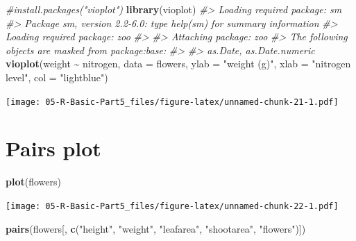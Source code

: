 \documentclass[
]{book}
\newenvironment{Shaded}{\begin{snugshade}}{\end{snugshade}}
\newcommand{\AttributeTok}[1]{\textcolor[rgb]{0.13,0.29,0.53}{#1}}
\newcommand{\CommentTok}[1]{\textcolor[rgb]{0.56,0.35,0.01}{\textit{#1}}}
\newcommand{\FunctionTok}[1]{\textcolor[rgb]{0.13,0.29,0.53}{\textbf{#1}}}
\newcommand{\NormalTok}[1]{#1}
\newcommand{\SpecialCharTok}[1]{\textcolor[rgb]{0.81,0.36,0.00}{\textbf{#1}}}
\newcommand{\StringTok}[1]{\textcolor[rgb]{0.31,0.60,0.02}{#1}}
\begin{document}
\begin{Shaded}
\begin{Highlighting}[]
\CommentTok{\#install.packages("vioplot")}
\FunctionTok{library}\NormalTok{(vioplot)}
\CommentTok{\#\textgreater{} Loading required package: sm}
\CommentTok{\#\textgreater{} Package \textquotesingle{}sm\textquotesingle{}, version 2.2{-}6.0: type help(sm) for summary information}
\CommentTok{\#\textgreater{} Loading required package: zoo}
\CommentTok{\#\textgreater{} }
\CommentTok{\#\textgreater{} Attaching package: \textquotesingle{}zoo\textquotesingle{}}
\CommentTok{\#\textgreater{} The following objects are masked from \textquotesingle{}package:base\textquotesingle{}:}
\CommentTok{\#\textgreater{} }
\CommentTok{\#\textgreater{}     as.Date, as.Date.numeric}
\FunctionTok{vioplot}\NormalTok{(weight }\SpecialCharTok{\textasciitilde{}}\NormalTok{ nitrogen, }\AttributeTok{data =}\NormalTok{ flowers, }
         \AttributeTok{ylab =} \StringTok{"weight (g)"}\NormalTok{, }\AttributeTok{xlab =} \StringTok{"nitrogen level"}\NormalTok{,}
         \AttributeTok{col =} \StringTok{"lightblue"}\NormalTok{)}
\end{Highlighting}
\end{Shaded}

\texttt{[image: 05-R-Basic-Part5\_files/figure-latex/unnamed-chunk-21-1.pdf]}

\section*{Pairs plot}\label{pairs-plot}

\begin{Shaded}
\begin{Highlighting}[]
\FunctionTok{plot}\NormalTok{(flowers)}
\end{Highlighting}
\end{Shaded}

\texttt{[image: 05-R-Basic-Part5\_files/figure-latex/unnamed-chunk-22-1.pdf]}

\begin{Shaded}
\begin{Highlighting}[]
\FunctionTok{pairs}\NormalTok{(flowers[, }\FunctionTok{c}\NormalTok{(}\StringTok{"height"}\NormalTok{, }\StringTok{"weight"}\NormalTok{, }\StringTok{"leafarea"}\NormalTok{, }
                \StringTok{"shootarea"}\NormalTok{, }\StringTok{"flowers"}\NormalTok{)])}
\end{Highlighting}
\end{Shaded}
\end{document}
